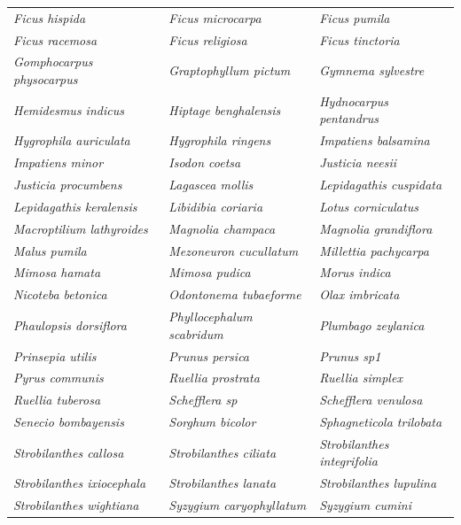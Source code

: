 \documentclass[runningheads]{llncs}
\begin{document}
\begin{longtable}{lll}
\textit{Ficus hispida} & \textit{Ficus microcarpa} & \textit{Ficus pumila} \\
\textit{Ficus racemosa} & \textit{Ficus religiosa} & \textit{Ficus tinctoria} \\
\textit{Gomphocarpus physocarpus} & \textit{Graptophyllum pictum} & \textit{Gymnema sylvestre} \\
\textit{Hemidesmus indicus} & \textit{Hiptage benghalensis} & \textit{Hydnocarpus pentandrus} \\
\textit{Hygrophila auriculata} & \textit{Hygrophila ringens} & \textit{Impatiens balsamina} \\
\textit{Impatiens minor} & \textit{Isodon coetsa} & \textit{Justicia neesii} \\
\textit{Justicia procumbens} & \textit{Lagascea mollis} & \textit{Lepidagathis cuspidata} \\
\textit{Lepidagathis keralensis} & \textit{Libidibia coriaria} & \textit{Lotus corniculatus} \\
\textit{Macroptilium lathyroides} & \textit{Magnolia champaca} & \textit{Magnolia grandiflora} \\
\textit{Malus pumila} & \textit{Mezoneuron cucullatum} & \textit{Millettia pachycarpa} \\
\textit{Mimosa hamata} & \textit{Mimosa pudica} & \textit{Morus indica} \\
\textit{Nicoteba betonica} & \textit{Odontonema tubaeforme} & \textit{Olax imbricata} \\
\textit{Phaulopsis dorsiflora} & \textit{Phyllocephalum scabridum} & \textit{Plumbago zeylanica} \\
\textit{Prinsepia utilis} & \textit{Prunus persica} & \textit{Prunus sp1} \\
\textit{Pyrus communis} & \textit{Ruellia prostrata} & \textit{Ruellia simplex} \\
\textit{Ruellia tuberosa} & \textit{Schefflera sp} & \textit{Schefflera venulosa} \\
\textit{Senecio bombayensis} & \textit{Sorghum bicolor} & \textit{Sphagneticola trilobata} \\
\textit{Strobilanthes callosa} & \textit{Strobilanthes ciliata} & \textit{Strobilanthes integrifolia} \\
\textit{Strobilanthes ixiocephala} & \textit{Strobilanthes lanata} & \textit{Strobilanthes lupulina} \\
\textit{Strobilanthes wightiana} & \textit{Syzygium caryophyllatum} & \textit{Syzygium cumini} \\

\end{longtable}
\end{document}
